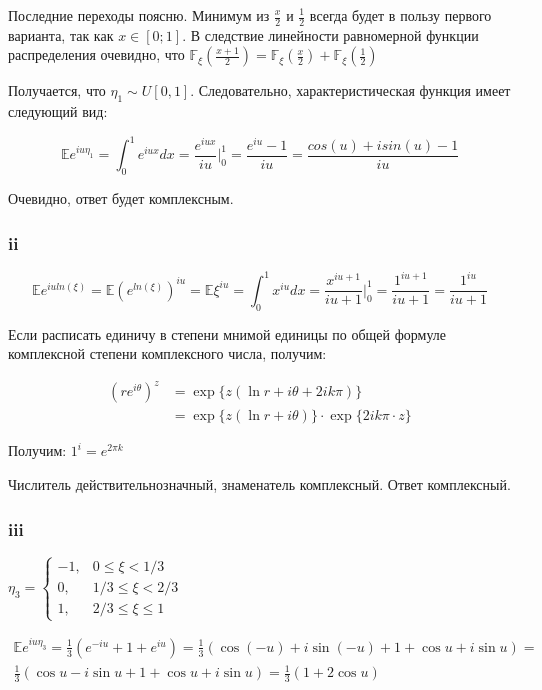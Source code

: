 \documentclass[a4paper,12pt]{article}
\def \mbb{\mathbb}
\def \E{\mbb{E}}
\def \F{\mbb{F}}
\begin{document}
Последние переходы поясню. Минимум из $ \frac{x}{2} $ и $ \frac{1}{2} $ всегда будет в пользу первого варианта, так как $ x \in [0;1] $. В следствие линейности равномерной функции распределения очевидно, что $ \F_\xi(\frac{x + 1}{2}) =  \F_\xi(\frac{x}{2}) + \F_\xi(\frac{1}{2}) $

Получается, что $ \eta_1 \sim U[0,1] $. Следовательно, характеристическая функция имеет следующий вид:

\[ \E e^{iu\eta_1} = \int_{0}^{1} e^{iux} dx =\frac{ e^{iux} }{iu}\biggr|_0^1 = \frac{e^{iu} - 1}{iu} = \frac{cos(u) + i sin(u) - 1}{iu}\]

Очевидно, ответ будет комплексным.


\subsubsection{ii}

\[ \E e^{iuln(\xi)}  = \E (e^{ln(\xi)})^{iu} = \E \xi^{iu} = \int_{0}^{1} x^{iu} dx =\frac{ x^{iu+1}}{iu+1} \biggr|_0^1 = \frac{1^{iu+1}}{iu+1} = \frac{ 1^{iu}}{iu+1}\]

Если расписать единичу в степени мнимой единицы по общей формуле комплексной степени комплексного числа, получим:

\[\begin{aligned}\left(r e^{i \theta}\right)^{z} &=\exp \{z(\ln r+i \theta+2 i k \pi)\} \\ &=\exp \{z(\ln r+i \theta)\} \cdot \exp \{2 i k \pi \cdot z\} \end{aligned}\]

Получим: $ 1^i = e^{2\pi k} $

Числитель действительнозначный, знаменатель комплексный. Ответ комплексный.


\subsubsection{iii}

$\eta_{3}=\left\{\begin{array}{ll}{-1,} & {0 \leq \xi<1 / 3} \\ {0,} & {1 / 3 \leq \xi<2 / 3} \\ {1,} & {2 / 3 \leq \xi \leq 1}\end{array}\right.$



\begin{equation}
\begin{aligned}
 \E e^{iu\eta_3}  = \frac{1}{3} (e^{-iu}  + 1 + e^{iu}) =\frac{1}{3}(\cos (-u)+i \sin (-u)+1+\cos u+i \sin u)=\\ \frac{1}{3}(\cos u-i \sin u+1+\cos u+i \sin u)=\frac{1}{3}(1+2 \cos u)
\end{aligned}
\end{equation}
\end{document}
